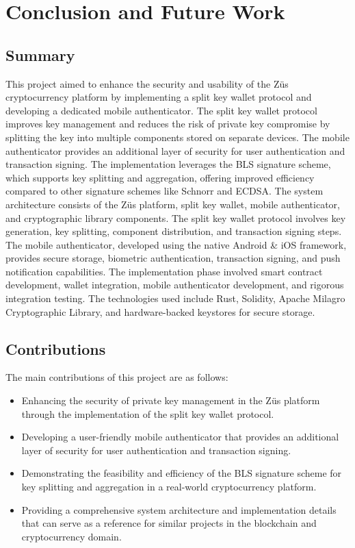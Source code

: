 \chapter{Conclusion and Future Work} %
\label{Chapter5} %
\section{Summary}
This project aimed to enhance the security and usability of the Züs cryptocurrency platform by implementing a split key wallet protocol and developing a dedicated mobile authenticator. The split key wallet protocol improves key management and reduces the risk of private key compromise by splitting the key into multiple components stored on separate devices. The mobile authenticator provides an additional layer of security for user authentication and transaction signing.
The implementation leverages the BLS signature scheme, which supports key splitting and aggregation, offering improved efficiency compared to other signature schemes like Schnorr and ECDSA. The system architecture consists of the Züs platform, split key wallet, mobile authenticator, and cryptographic library components.
The split key wallet protocol involves key generation, key splitting, component distribution, and transaction signing steps. The mobile authenticator, developed using the native Android & iOS framework, provides secure storage, biometric authentication, transaction signing, and push notification capabilities.
The implementation phase involved smart contract development, wallet integration, mobile authenticator development, and rigorous integration testing. The technologies used include Rust, Solidity, Apache Milagro Cryptographic Library, and hardware-backed keystores for secure storage.
\section{Contributions}
The main contributions of this project are as follows:
\begin{itemize}
\item Enhancing the security of private key management in the Züs platform through the implementation of the split key wallet protocol.
\item Developing a user-friendly mobile authenticator that provides an additional layer of security for user authentication and transaction signing.
\item Demonstrating the feasibility and efficiency of the BLS signature scheme for key splitting and aggregation in a real-world cryptocurrency platform.
\item Providing a comprehensive system architecture and implementation details that can serve as a reference for similar projects in the blockchain and cryptocurrency domain.
\end{itemize}
